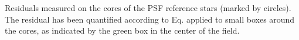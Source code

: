 Residuals measured on the cores of the PSF reference stars (marked by circles). The residual has been quantified according to Eq. applied to small boxes around the cores, as indicated by the green box in the center of the field.
  
